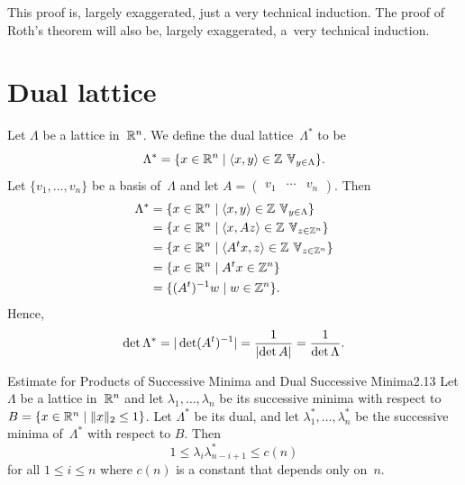 \documentclass{Vorlesungstemplate_English} %
\begin{document}
\noindent This proof is, largely exaggerated, just a very technical induction.
The proof of Roth's theorem will also be, largely exaggerated, a~very technical induction.

\section{Dual lattice}

Let \(\Lambda\) be a lattice in~\(\mathbb{R}^n\).
We define the dual lattice~\(\Lambda^*\) to be
\begin{equation*}
    \Lambda^*
    = \{x \in \R^n \mid \langle x,y\rangle \in \Z \forall_{y \in \Lambda}\}.
\end{equation*}
Let \(\{v_1, \dots, v_n\}\) be a basis of~\(\Lambda\) and let \(A = \begin{pmatrix} v_1 & \cdots & v_n\end{pmatrix} \).
Then
\begin{equation*}
    \begin{split}
        \Lambda^*
        &= \{x \in \R^n \mid \inp{x}{y} \in \Z \forall_{y \in \Lambda}\} \\
        &= \{x \in \R^n \mid \inp{x}{A z} \in \Z\forall_{z \in \Z^n}\} \\
        &= \{x \in \R^n \mid \inp{A^t x}{z} \in \Z\forall_{z \in \Z^n}\} \\
        &= \{x \in \R^n \mid A^t x \in \Z^n\} \\
        &= \{(A^t)^{-1} w \mid w \in \Z^n\}.
    \end{split}
\end{equation*}
Hence,
\begin{equation*}
    \det \Lambda^*
    = |\det(A^t)^{-1}|
    = \frac{1}{\left| \det A\right|}
    = \frac{1}{\det \Lambda}.
\end{equation*}

\begin{theorem}{Estimate for Products of Successive Minima and Dual Successive Minima}{2.13}
    Let \(\Lambda\) be a lattice in~\(\mathbb{R}^n\) and let \(\lambda_1, \dots, \lambda_n\) be its successive minima with respect to \(B = \{x \in \mathbb{R}^n \mid \|x\|_2 \le 1\}\).
    Let \(\Lambda^*\) be its dual, and let \(\lambda_1^*, \dots, \lambda_n^*\) be the successive minima of~\(\Lambda^*\) with respect to \(B\).
    Then
    \begin{equation*}
        1
        \le \lambda_i \lambda_{n-i+1}^*
        \le c(n)
    \end{equation*}
    for all \(1 \le i \le n\) where \(c(n)\) is a constant that depends only on~\(n\).
\end{theorem}
\end{document}

